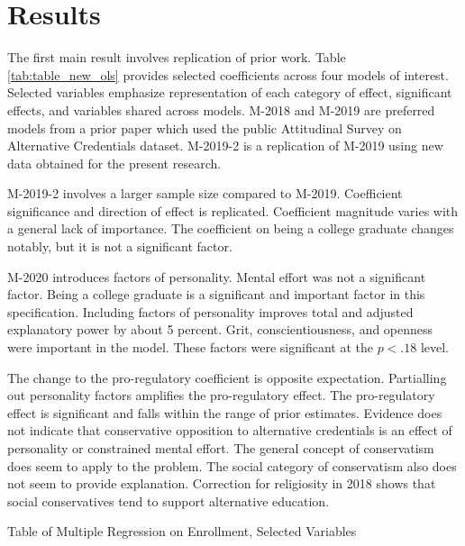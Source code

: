 \documentclass[review]{elsarticle}
\begin{document}
\section{Results}

The first main result involves replication of prior work.
Table \ref{tab:table_new_ols} provides selected coefficients across four models of interest.
Selected variables emphasize representation of each category of effect,
significant effects,
and variables shared across models.
M-2018 and M-2019 are preferred models from a prior paper which used the public Attitudinal Survey on Alternative Credentials dataset\cite{vandivier2020preliminary}.
M-2019-2 is a replication of M-2019 using new data obtained for the present research.

M-2019-2 involves a larger sample size compared to M-2019.
Coefficient significance and direction of effect is replicated.
Coefficient magnitude varies with a general lack of importance.
The coefficient on being a college graduate changes notably, but it is not a significant factor.

M-2020 introduces factors of personality.
Mental effort was not a significant factor.
Being a college graduate is a significant and important factor in this specification.
Including factors of personality improves total and adjusted explanatory power by about 5 percent.
Grit, conscientiousness, and openness were important in the model.
These factors were significant at the $p<.18$ level.

The change to the pro-regulatory coefficient is opposite expectation.
Partialling out personality factors amplifies the pro-regulatory effect.
The pro-regulatory effect is significant and falls within the range of prior estimates.
Evidence does not indicate that conservative opposition to alternative credentials is an effect of personality or constrained mental effort.
The general concept of conservatism does seem to apply to the problem.
The social category of conservatism also does not seem to provide explanation.
Correction for religiosity in 2018 shows that social conservatives tend to support alternative education.

\begin{table}
    \caption{Table of Multiple Regression on Enrollment, Selected Variables}
    \resizebox{\columnwidth}{!}{
        
    }
    \label{tab:table_new_ols}
\end{table}
\end{document}
